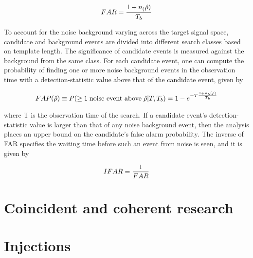 \documentclass[binding=0.6cm, LaM]{sapthesis}
\begin{document}
		\begin{equation}
			FAR = {{1 + n_(\hat \rho)} \over {T_b}}
		\end{equation}

	To account for the noise background varying across the target signal space, 
	candidate and background events are divided into different search classes based on template length. 
	The significance of candidate events is measured against the background from the same class. 
	For each candidate event, one can compute the probability of finding one or more 
	noise background events in the observation time with a detection-statistic value above that of the candidate event, given by 

		\begin{equation}
			FAP(\hat \rho) \equiv P(\geq 1 \hspace*{0.1cm}\text{noise event above}\hspace*{0.1cm} \hat \rho|T,T_b) = 1 - e^{-T{{1+n_b(\hat \rho)} \over{T_b}}}
		\end{equation}

	where T is the observation time of the search.
	If a candidate event’s detection-statistic value is larger 
	than that of any noise background event, 
	then the analysis places an upper bound on the candidate’s false alarm probability. 
	The inverse of FAR specifies the waiting time before such an event from noise is seen, and it is given by 

		\begin{equation}
			IFAR = {1 \over {FAR}}
		\end{equation}   

\section{Coincident and coherent research}

\section{Injections}
\end{document}
